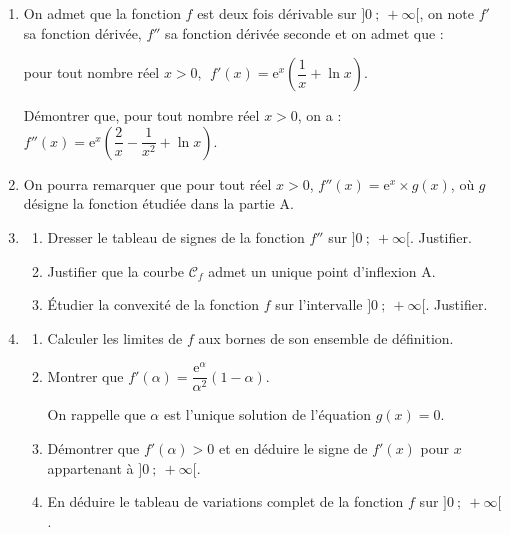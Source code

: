 \documentclass[10pt]{article}
\providecommand{\e}{{\mathrm{e}}}
\begin{document}
\begin{enumerate}
\item On admet que la fonction $f$ est deux fois dérivable sur $]0~;~+\infty[$, on note $f'$ sa fonction dérivée, $f''$ sa fonction dérivée seconde et on admet que :

pour tout nombre réel $x > 0,\:\: f'(x) = \e^x \left(\dfrac 1x + \ln x\right)$.

Démontrer que, pour tout nombre réel $x > 0$, on a : $f''(x) = \e^x \left(\dfrac 2x - \dfrac{1}{x^2} + \ln x\right)$.
\item On pourra remarquer que pour tout réel $x > 0$,\: $f''(x) = \e^x \times  g(x)$, où $g$ désigne la fonction étudiée dans la partie A.
\item 
	\begin{enumerate}
		\item Dresser le tableau de signes de la fonction $f''$ sur $]0~;~+\infty[$. Justifier.
		\item Justifier que la courbe $\mathcal{C}_f$ admet un unique point d'inflexion A.
		\item Étudier la convexité de la fonction $f$ sur l'intervalle $]0~;~+\infty[$. Justifier.
	\end{enumerate}
\item
	\begin{enumerate}
		\item Calculer les limites de $f$ aux bornes de son ensemble de définition.
		\item Montrer que $f'(\alpha) = \dfrac{\e^{\alpha}}{\alpha^2}(1 - \alpha)$.

On rappelle que $\alpha$ est l'unique solution de l'équation $g(x) = 0$.
		\item Démontrer que $f'(\alpha) > 0$ et en déduire le signe de $f'(x)$ pour $x$ appartenant à $]0~;~+\infty[$.
		\item En déduire le tableau de variations complet de la fonction $f$ sur $]0~;~+\infty[$.
	\end{enumerate}
\end{enumerate}
\end{document}
